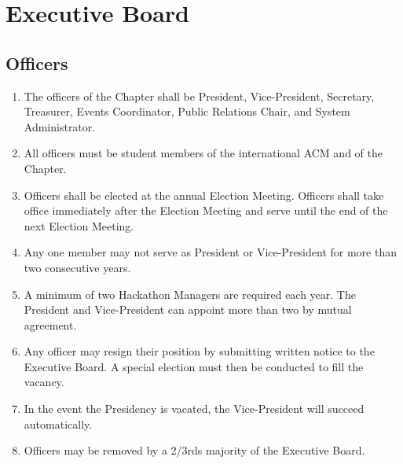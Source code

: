 \documentclass[12pt, letterpaper, oneside]{book}
\begin{document}
\chapter{Executive Board}
\section{Officers}
\begin{enumerate}
    \item The officers of the Chapter shall be President, Vice-President,
        Secretary, Treasurer, Events Coordinator, Public Relations Chair, and
        System Administrator.
    \item All officers must be student members of the international ACM and of
        the Chapter.
    \item Officers shall be elected at the annual Election Meeting. Officers
        shall take office immediately after the Election Meeting and serve until
        the end of the next Election Meeting.
    \item Any one member may not serve as President or Vice-President for more
        than two consecutive years.
    \item A minimum of two Hackathon Managers are required each year. The
        President and Vice-President can appoint more than two by mutual
        agreement.
    \item Any officer may resign their position by submitting written notice to
        the Executive Board. A special election must then be conducted to fill
        the vacancy.
    \item In the event the Presidency is vacated, the Vice-President will
        succeed automatically.
    \item Officers may be removed by a 2/3rds majority of the Executive Board.
\end{enumerate}
\end{document}

